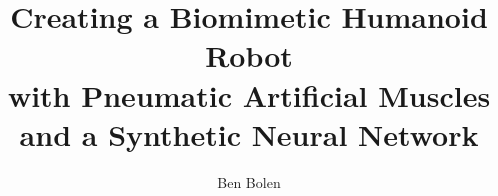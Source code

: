 \documentclass[double,12pt]{psutex}
\title{Creating a Biomimetic Humanoid Robot \\ with Pneumatic Artificial Muscles and a Synthetic Neural Network} %
\author{Ben Bolen}
\begin{document}
\maketitle









% 

\tableofcontents
\listoftables
\listoffigures

\mainmatter










\appendix
\renewcommand{\theequation}{\thechapter\arabic{equation}}
\renewcommand{\thetable}{\thechapter\arabic{table}}
\renewcommand{\thefigure}{\thechapter\arabic{figure}}



\end{document}
